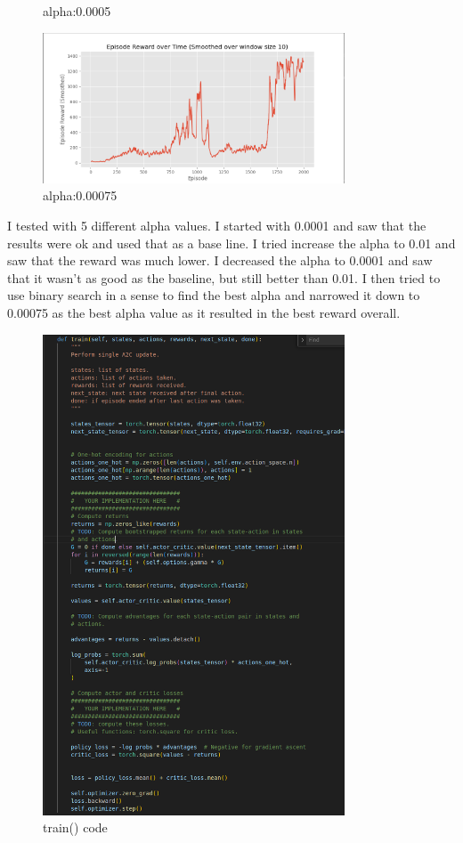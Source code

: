\documentclass[a4paper]{article}
\theoremstyle{definition}
\newenvironment{soln}{
    \leavevmode\color{blue}\ignorespaces
}{}
\begin{document}
\begin{enumerate}
\begin{soln}
\begin{figure}[H]
        \caption{alpha:0.0005}
        \label{fig:a2c}
    \end{figure}
    \begin{figure}[H]
        \centering
        \includegraphics[width=0.8\textwidth]{images/alpha0.00075.png}
        \caption{alpha:0.00075}
    \end{figure}

    I tested with 5 different alpha values. I started with 0.0001 and saw that the results were ok and used that as a base line. I tried increase the alpha
    to 0.01 and saw that the reward was much lower. I decreased the alpha to 0.0001 and saw that it wasn't as good as the baseline, but still better than
    0.01. I then tried to use binary search in a sense to find the best alpha and narrowed it down to 0.00075 as the best alpha value as it resulted in the best
    reward overall.

    \begin{figure}[H]
        \centering
        \includegraphics[width=0.8\textwidth]{images/5.code.png}
        \caption{train() code}
   \end{figure}
\end{soln}


\end{enumerate}
\end{document}
